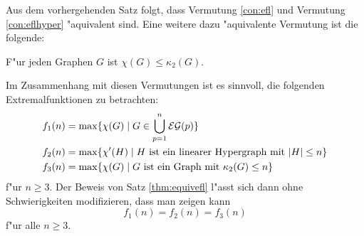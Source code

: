 Aus dem vorhergehenden Satz folgt, dass Vermutung \ref{con:efl} und Vermutung \ref{con:eflhyper} "aquivalent sind. Eine weitere dazu "aquivalente Vermutung ist die folgende:

\begin{conjecture}
  F"ur jeden Graphen $G$ ist $\chi(G) \leq \kappa_{2}(G)$. 
  \label{con:eflkrausz}
\end{conjecture}

Im Zusammenhang mit diesen Vermutungen ist es sinnvoll, die folgenden Extremalfunktionen zu betrachten:
\begin{align*}
  f_1(n) &= \max \{\chi(G) \;|\; G\in \bigcup \limits_{p=1}^{n} {\cal EG}(p) \} \\
  f_2(n) &=  \max \{\chi'(H) \;|\; H \text{ ist ein linearer Hypergraph mit } |H| \leq n \} \\
  f_3(n) &= \max \{\chi(G) \;|\; G \text{ ist ein Graph mit }\kappa_{2}(G) \leq n \}
\end{align*}
f"ur $n \geq 3$. 
Der Beweis von Satz \ref{thm:equivefl} l"asst sich dann ohne Schwierigkeiten modifizieren, dass man zeigen kann $$f_1(n) = f_2(n) = f_3(n) $$ f"ur alle $n\geq 3$. 

